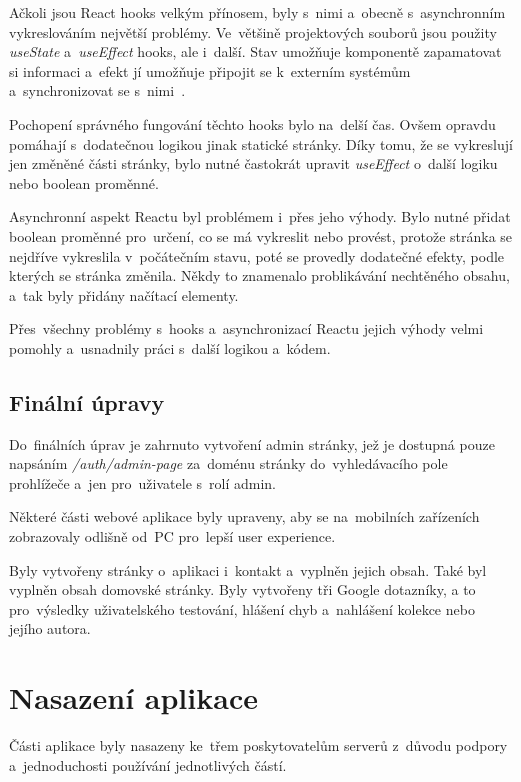 \documentclass[twoside]{ctuthesis}
\begin{document}
Ačkoli jsou React hooks velkým přínosem, byly s~nimi a~obecně s~asynchronním vykreslováním největší problémy. Ve~většině projektových souborů jsou použity \emph{useState} a~\emph{useEffect} hooks, ale i~další. Stav umožňuje komponentě zapamatovat si informaci a~efekt jí umožňuje připojit se k~externím systémům a~synchronizovat se s~nimi~\cite{builtinhooks}.

Pochopení správného fungování těchto hooks bylo na~delší čas. Ovšem opravdu pomáhají s~dodatečnou logikou jinak statické stránky. Díky tomu, že se vykreslují jen změněné části stránky, bylo nutné častokrát upravit \emph{useEffect} o~další logiku nebo boolean proměnné.

Asynchronní aspekt Reactu byl problémem i~přes jeho výhody. Bylo nutné přidat boolean proměnné pro~určení, co se má vykreslit nebo provést, protože stránka se nejdříve vykreslila v~počátečním stavu, poté se provedly dodatečné efekty, podle kterých se stránka změnila. Někdy to znamenalo problikávání nechtěného obsahu, a~tak byly přidány načítací elementy.

Přes~všechny problémy s~hooks a~asynchronizací Reactu jejich výhody velmi pomohly a~usnadnily práci s~další logikou a~kódem.

\newpage

\subsection{Finální úpravy}

Do~finálních úprav je zahrnuto vytvoření admin stránky, jež je dostupná pouze napsáním \emph{/auth/admin-page} za~doménu stránky do~vyhledávacího pole prohlížeče a~jen pro~uživatele s~rolí admin.

Některé části webové aplikace byly upraveny, aby se na~mobilních zařízeních zobrazovaly odlišně od~PC pro~lepší user experience.

Byly vytvořeny stránky o~aplikaci i~kontakt a~vyplněn jejich obsah. Také byl vyplněn obsah domovské stránky. Byly vytvořeny tři Google dotazníky, a to pro~výsledky uživatelského testování, hlášení chyb a~nahlášení kolekce nebo jejího autora.

\section{Nasazení aplikace}

Části aplikace byly nasazeny ke~třem poskytovatelům serverů z~důvodu podpory a~jednoduchosti používání jednotlivých částí.
\end{document}
